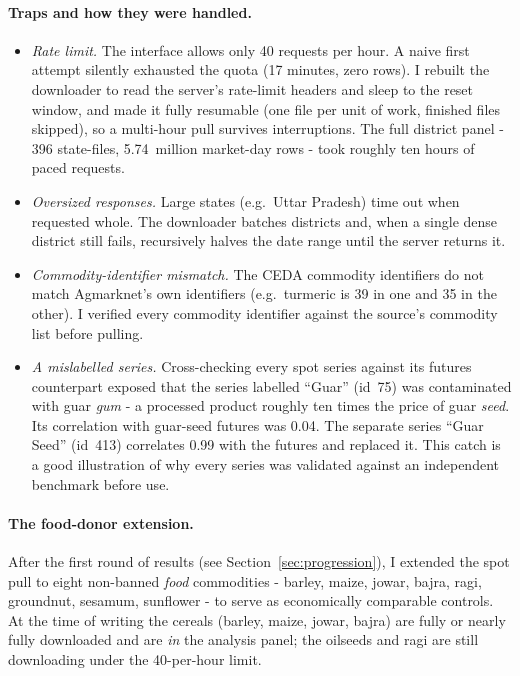 \documentclass[11pt]{article}
\begin{document}
\paragraph{Traps and how they were handled.}
\begin{itemize}[leftmargin=1.6em,itemsep=1pt]
  \item \emph{Rate limit.} The interface allows only 40 requests per hour. A naive
        first attempt silently exhausted the quota (17 minutes, zero rows). I rebuilt the
        downloader to read the server's rate-limit headers and sleep to the reset window,
        and made it fully resumable (one file per unit of work, finished files skipped),
        so a multi-hour pull survives interruptions. The full district panel -
        396 state-files, 5.74~million market-day rows - took roughly ten hours of paced
        requests.
  \item \emph{Oversized responses.} Large states (e.g.\ Uttar Pradesh) time out when
        requested whole. The downloader batches districts and, when a single dense
        district still fails, recursively halves the date range until the server returns
        it.
  \item \emph{Commodity-identifier mismatch.} The CEDA commodity identifiers do not match
        Agmarknet's own identifiers (e.g.\ turmeric is 39 in one and 35 in the other). I
        verified every commodity identifier against the source's commodity list before
        pulling.
  \item \emph{A mislabelled series.} Cross-checking every spot series against its futures
        counterpart exposed that the series labelled ``Guar'' (id~75) was contaminated
        with guar \emph{gum} - a processed product roughly ten times the price of guar
        \emph{seed}. Its correlation with guar-seed futures was 0.04. The separate series
        ``Guar Seed'' (id~413) correlates 0.99 with the futures and replaced it. This
        catch is a good illustration of why every series was validated against an
        independent benchmark before use.
\end{itemize}

\paragraph{The food-donor extension.} After the first round of results (see
Section~\ref{sec:progression}), I extended the spot pull to eight non-banned \emph{food}
commodities - barley, maize, jowar, bajra, ragi, groundnut, sesamum, sunflower - to
serve as economically comparable controls. At the time of writing the cereals (barley,
maize, jowar, bajra) are fully or nearly fully downloaded and are \emph{in} the analysis
panel; the oilseeds and ragi are still downloading under the 40-per-hour limit.
\end{document}
